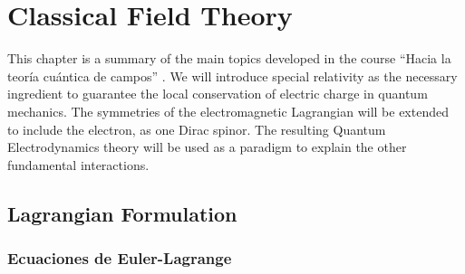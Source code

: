 
\chapter{Classical Field Theory}
\label{chap:cft}

This chapter is a summary of the main topics developed in the course ``Hacia la teoría cuántica de campos'' \cite{lsm}. We will introduce special relativity as the necessary ingredient to guarantee the local conservation of electric charge in quantum mechanics. The symmetries of the electromagnetic Lagrangian will be extended to include the electron, as one Dirac spinor. The resulting Quantum Electrodynamics theory will be used as a paradigm to explain the other fundamental interactions.

\section{Lagrangian Formulation}
\label{sec:lagr-form}
\subsection{Ecuaciones de Euler-Lagrange}


